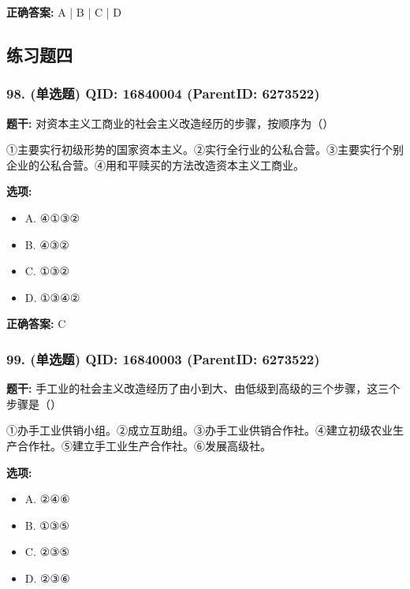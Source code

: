 \documentclass[12pt,UTF8]{ctexart}
\begin{document}
\textbf{正确答案:}
A | B | C | D

\vspace{0.3em}\hrulefill\vspace{0.7em}

\subsection*{练习题四}

\subsubsection*{98. (单选题) \small QID: 16840004 (ParentID: 6273522)}

\textbf{题干:}
对资本主义工商业的社会主义改造经历的步骤，按顺序为（）
\par
①主要实行初级形势的国家资本主义。②实行全行业的公私合营。③主要实行个别企业的公私合营。④用和平赎买的方法改造资本主义工商业。



\textbf{选项:}
\begin{itemize}[leftmargin=*]

  \item A. ④①③②

  \item B. ④③②

  \item C. ①③②

  \item D. ①③④②

\end{itemize}

\textbf{正确答案:}
C

\vspace{0.3em}\hrulefill\vspace{0.7em}

\subsubsection*{99. (单选题) \small QID: 16840003 (ParentID: 6273522)}

\textbf{题干:}
手工业的社会主义改造经历了由小到大、由低级到高级的三个步骤，这三个步骤是（）
\par
①办手工业供销小组。②成立互助组。③办手工业供销合作社。④建立初级农业生产合作社。⑤建立手工业生产合作社。⑥发展高级社。



\textbf{选项:}
\begin{itemize}[leftmargin=*]

  \item A. ②④⑥

  \item B. ①③⑤

  \item C. ②③⑤

  \item D. ②③⑥

\end{itemize}
\end{document}
